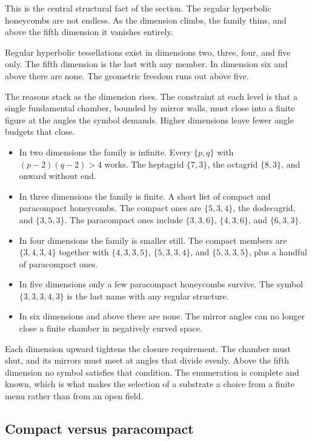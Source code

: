 This is the central structural fact of the section. The regular hyperbolic honeycombs are not endless. As the dimension climbs, the family thins, and above the fifth dimension it vanishes entirely.

\begin{theorem}
Regular hyperbolic tessellations exist in dimensions two, three, four, and five only. The fifth dimension is the last with any member. In dimension six and above there are none. The geometric freedom runs out above five.
\end{theorem}

The reasons stack as the dimension rises. The constraint at each level is that a single fundamental chamber, bounded by mirror walls, must close into a finite figure at the angles the symbol demands. Higher dimensions leave fewer angle budgets that close.

\begin{itemize}
\item In two dimensions the family is infinite. Every $\{p,q\}$ with $(p-2)(q-2) > 4$ works. The heptagrid $\{7,3\}$, the octagrid $\{8,3\}$, and onward without end.
\item In three dimensions the family is finite. A short list of compact and paracompact honeycombs. The compact ones are $\{5,3,4\}$, the dodecagrid, and $\{3,5,3\}$. The paracompact ones include $\{3,3,6\}$, $\{4,3,6\}$, and $\{6,3,3\}$.
\item In four dimensions the family is smaller still. The compact members are $\{3,4,3,4\}$ together with $\{4,3,3,5\}$, $\{5,3,3,4\}$, and $\{5,3,3,5\}$, plus a handful of paracompact ones.
\item In five dimensions only a few paracompact honeycombs survive. The symbol $\{3,3,3,4,3\}$ is the last name with any regular structure.
\item In six dimensions and above there are none. The mirror angles can no longer close a finite chamber in negatively curved space.
\end{itemize}

Each dimension upward tightens the closure requirement. The chamber must shut, and its mirrors must meet at angles that divide evenly. Above the fifth dimension no symbol satisfies that condition. The enumeration is complete and known, which is what makes the selection of a substrate a choice from a finite menu rather than from an open field.

\subsection{Compact versus paracompact}


